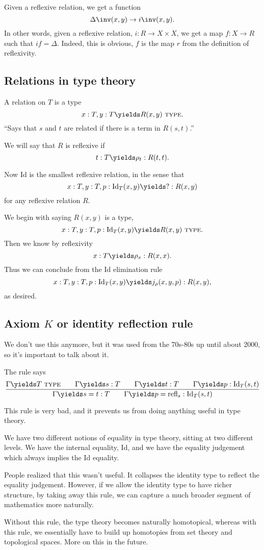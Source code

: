 \documentclass{article}
\newcommand\TYPE{\text{ \scshape{type}}}
\newcommand\IdT{\mathrm{Id}}
\newcommand\refl{\mathrm{refl}}
\begin{document}
Given a reflexive relation, we get a function
\[ \Delta\inv(x,y) \to i\inv(x,y).
    \]
In other words, given a reflexive relation, $i:R\to X\times X$,
we get a map 
$f:X\to R$ such that 
$if = \Delta$. Indeed, this is obvious, $f$ is the map $r$
from the definition of reflexivity.

\subsection{Relations in type theory}

A relation on $T$ is a type 
\[ x:T, y:T\yields R(x,y)\TYPE. \]
``Says that $s$ and $t$ are related if there is a term in 
$R(s,t)$.''

We will say that $R$ is reflexive if 
\[t:T\yields \rho_t:R(t,t).\]

Now $\IdT$ is the smallest reflexive relation, in the sense 
that 
\[ x:T,y:T,p:\IdT_T(x,y) \yields ?: R(x,y)\]
for any reflexive relation $R$.

We begin with saying $R(x,y)$ is a type,
\[ x:T,y:T,p:\IdT_T(x,y)\yields R(x,y)\TYPE.\]
Then we know by reflexivity
\[x:T\yields \rho_x :R(x,x). \]
Thus we can conclude from the $\IdT$ elimination rule
\[ x:T,y:T,p:\IdT_T(x,y)\yields j_\rho(x,y,p):R(x,y),
    \]
as desired.

\subsection{Axiom $K$ or identity reflection rule}

We don't use this anymore, but it was used from the 
70s-80s
up until about 2000,
so it's important to talk about it.

The rule says 
\[\frac{
    \Gamma \yields T\TYPE\qquad 
    \Gamma \yields s:T\qquad
    \Gamma \yields t:T\qquad
    \Gamma \yields p:\IdT_T(s,t)
}{
    \Gamma \yields s=t:T \qquad
    \Gamma \yields p = \refl_s : \IdT_T(s,t)
}
\]

This rule is very bad, and it prevents us from doing anything
useful in type theory.

We have two different notions of equality in type theory, 
sitting at two different levels.
We have the internal equality, $\IdT$,
and we have the equality judgement which always implies the 
$\IdT$ equality.

People realized that this wasn't useful. It collapses 
the identity type to reflect the equality judgement.
However, if we allow the identity type to have richer structure,
by taking away this rule, we can capture a much broader 
segment of mathematics more naturally. 

Without this rule, the type theory becomes naturally homotopical,
whereas with this rule, we essentially 
have to build up homotopies from 
set theory and topological spaces. More on this in the future.
\end{document}
